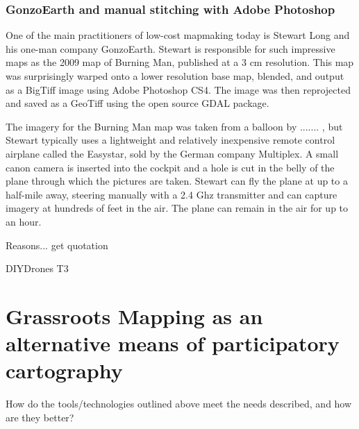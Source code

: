 \documentclass[11pt]{report}
\begin{document}
\subsection{GonzoEarth and manual stitching with Adobe Photoshop}

One of the main practitioners of low-cost mapmaking today is Stewart Long and his one-man company GonzoEarth. Stewart is responsible for such impressive maps as the 2009 map of Burning Man, published at a 3 cm resolution. This map was surprisingly warped onto a lower resolution base map, blended, and output as a BigTiff image using Adobe Photoshop CS4. The image was then reprojected and saved as a GeoTiff using the open source GDAL package.

The imagery for the Burning Man map was taken from a balloon by ....... , but Stewart typically uses a lightweight and relatively inexpensive remote control airplane called the Easystar, sold by the German company Multiplex. A small canon camera is inserted into the cockpit and a hole is cut in the belly of the plane through which the pictures are taken. Stewart can fly the plane at up to a half-mile away, steering manually with a 2.4 Ghz transmitter and can capture imagery at hundreds of feet in the air. The plane can remain in the air for up to an hour. 

Reasons... get quotation

DIYDrones T3


\chapter{Grassroots Mapping as an alternative means of participatory cartography}

How do the tools/technologies outlined above meet the needs described, and how are they better?

\end{document}
